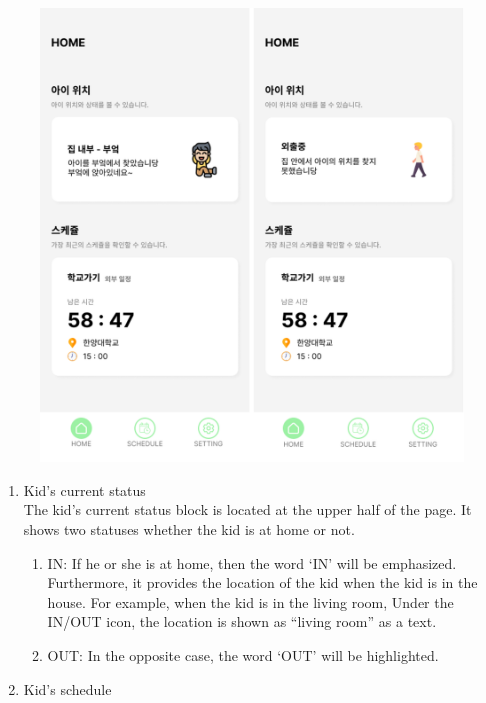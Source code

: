\documentclass[conference]{IEEEtran}
\begin{document}
\begin{enumerate}[label=\arabic*.]
    \begin{figure}[H]\centering\includegraphics[scale=0.4]{images/main.png}\end{figure}  
    \begin{enumerate}[label=\alph*.]
        \item {\large{Kid's current status}} \\
        The kid’s current status block is located at the upper half of the page. It shows two statuses whether the kid is at home or not. \\
        \begin{enumerate}[label=\roman*.]
            \item {\large{IN: If he or she is at home, then the word ‘IN’ will be emphasized. Furthermore, it provides the location of the kid when the kid is in the house. For example, when the kid is in the living room, Under the IN/OUT icon, the location is shown as “living room” as a text.}} \\
            \item {\large{OUT: In the opposite case, the word ‘OUT’ will be highlighted. }} \\
        \end{enumerate}
        \item {\large{Kid’s schedule}} \\

\end{enumerate}
\end{enumerate}
\end{document}
